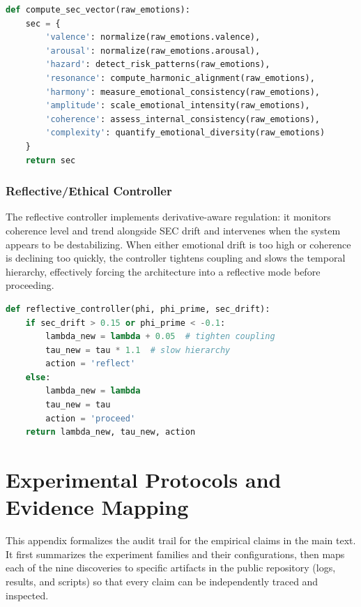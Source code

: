 \documentclass[11pt,a4paper]{article}
\begin{document}
\begin{lstlisting}[language=Python, caption={SEC calibration pseudocode}]
def compute_sec_vector(raw_emotions):
    sec = {
        'valence': normalize(raw_emotions.valence),
        'arousal': normalize(raw_emotions.arousal),
        'hazard': detect_risk_patterns(raw_emotions),
        'resonance': compute_harmonic_alignment(raw_emotions),
        'harmony': measure_emotional_consistency(raw_emotions),
        'amplitude': scale_emotional_intensity(raw_emotions),
        'coherence': assess_internal_consistency(raw_emotions),
        'complexity': quantify_emotional_diversity(raw_emotions)
    }
    return sec
\end{lstlisting}

\subsubsection{Reflective/Ethical Controller}

The reflective controller implements derivative-aware regulation: it monitors coherence level and trend alongside SEC drift and intervenes when the system appears to be destabilizing. When either emotional drift is too high or coherence is declining too quickly, the controller tightens coupling and slows the temporal hierarchy, effectively forcing the architecture into a reflective mode before proceeding.

\begin{lstlisting}[language=Python, caption={Reflective controller pseudocode}]
def reflective_controller(phi, phi_prime, sec_drift):
    if sec_drift > 0.15 or phi_prime < -0.1:
        lambda_new = lambda + 0.05  # tighten coupling
        tau_new = tau * 1.1  # slow hierarchy
        action = 'reflect'
    else:
        lambda_new = lambda
        tau_new = tau
        action = 'proceed'
    return lambda_new, tau_new, action
\end{lstlisting}



\section{Experimental Protocols and Evidence Mapping}
\label{app:protocols}

This appendix formalizes the audit trail for the empirical claims in the main text. It first
summarizes the experiment families and their configurations, then maps each of the nine
discoveries to specific artifacts in the public repository (logs, results, and scripts) so
that every claim can be independently traced and inspected.
\end{document}
